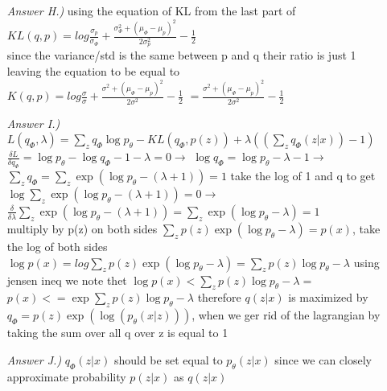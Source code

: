 \documentclass{article}
\theoremstyle{definition}
\theoremstyle{remark}
\begin{document}
\begin{enumerate}[font={\Large\bfseries}]
\begin{itemize}
			\item[\textit{Answer H.)}] using the equation of KL from the last part of\\
			$KL(q,p) = log \frac{\sigma_p}{\sigma_{\Phi}}+ \frac{\sigma_{\Phi}^2+(\mu_{\Phi}-\mu_p)^2}{2\sigma_p^2} - \frac{1}{2}$\\
			since the variance/std is the same between p and q their ratio is just 1 leaving the equation to be equal to\\
			$K(q,p) = log \frac{\sigma}{\sigma}+ \frac{\sigma^2+(\mu_{\Phi}-\mu_p)^2}{2\sigma^2} - \frac{1}{2}$
			$ = \frac{\sigma^2+(\mu_{\Phi}-\mu_p)^2}{2\sigma^2} - \frac{1}{2}$
			
			\item[\textit{Answer I.)}] $L(q_{\Phi},\lambda) = \sum_z q_{\Phi} \log p_{\theta} - KL(q_{\Phi}, p(z)) + \lambda((\sum_z q_{\Phi}(z|x)) -1)$\\
			$\frac{\delta L}{\delta q_{\Phi}} = \log p_{\theta} - \log q_{\Phi} - 1 - \lambda = 0 \rightarrow$
			$\log q_{\Phi} = \log p_{\theta} - \lambda - 1 \rightarrow$\\
			$\sum_z q_{\Phi} = \sum_z \exp (\log p_{\theta}-(\lambda+1)) = 1$ take the log of 1 and q to get\\
			$\log \sum_z \exp (\log p_{\theta}-(\lambda+1))=0 \rightarrow$
			$\frac{\delta}{\delta \lambda} \sum_z \exp (\log  p_{\theta}-(\lambda+1)) = \sum_z \exp (\log  p_{\theta}-\lambda) = 1$\\
			multiply by p(z) on both sides $\sum_z p(z) \exp (\log p_{\theta}-\lambda) = p(x)$, take the log of both sides\\
			$\log p(x) = log \sum_z p(z) \exp ( \log p_{\theta} - \lambda) = \sum_z p(z) \log p_{\theta} - \lambda$
			using jensen ineq we note thet $\log p(x) < \sum_z p(z) \log p_{\theta} - \lambda = $\\
			$p(x) <= \exp \sum_z p(z) \log p_{\theta} - \lambda$ therefore $q(z|x)$ is maximized by 
			$q_{\Phi} = p(z) \exp (\log (p_{\theta}(x|z)))$, when we ger rid of the lagrangian by taking the sum over all q over z is equal to 1


			\item[\textit{Answer J.)}] $q_{\Phi}(z|x)$ should be set equal to $p_{\theta}(z|x)$ since we can closely approximate probability $p(z|x)$ as $q(z|x)$

		\end{itemize}
		
		        
		\begin{center}
			

\end{center}
\end{enumerate}
\end{document}
